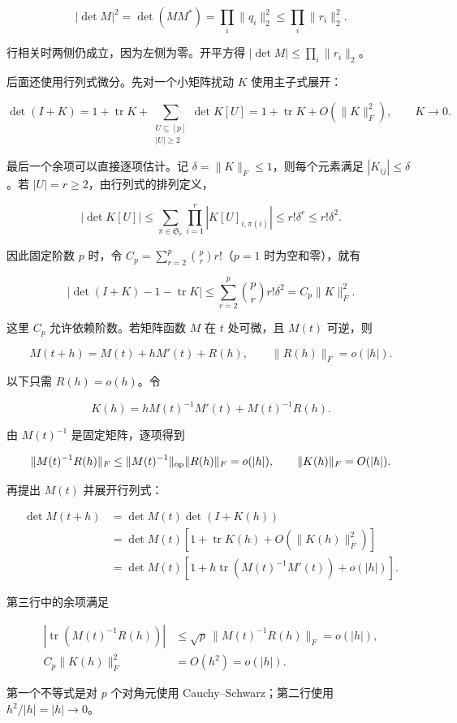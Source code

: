 \documentclass[11pt,a4paper]{article}
\begin{document}
\[|\det M|^2=\det(MM^*)=\prod_i\|q_i\|_2^2
\le\prod_i\|r_i\|_2^2.\]

行相关时两侧仍成立，因为左侧为零。开平方得 \(|\det M|\le\prod_i\|r_i\|_2\)。

后面还使用行列式微分。先对一个小矩阵扰动 \(K\) 使用主子式展开：

\[\det(I+K)=1+\operatorname{tr}K+
\sum_{\substack{U\subseteq[p]\\|U|\ge2}}\det K[U]
=1+\operatorname{tr}K+O(\|K\|_F^2),\qquad K\to0.\]

最后一个余项可以直接逐项估计。记 \(\delta=\|K\|_F\le1\)，则每个元素满足 \(|K_{ij}|\le\delta\)。若 \(|U|=r\ge2\)，由行列式的排列定义，

\[|\det K[U]|
\le\sum_{\pi\in \mathfrak S_r}\prod_{i=1}^r|K[U]_{i,\pi(i)}|
\le r!\delta^r\le r!\delta^2.\]

因此固定阶数 \(p\) 时，令 \(C_p=\sum_{r=2}^p\binom pr r!\)（\(p=1\) 时为空和零），就有

\[\left|\det(I+K)-1-\operatorname{tr}K\right|
\le\sum_{r=2}^p\binom pr r!\delta^2=C_p\|K\|_F^2.\]

这里 \(C_p\) 允许依赖阶数。若矩阵函数 \(M\) 在 \(t\) 处可微，且 \(M(t)\) 可逆，则

\[M(t+h)=M(t)+hM'(t)+R(h),\qquad
\|R(h)\|_F=o(|h|).\]

以下只需 \(R(h)=o(h)\)。令

\[K(h)=hM(t)^{-1}M'(t)+M(t)^{-1}R(h).\]

由 \(M(t)^{-1}\) 是固定矩阵，逐项得到

\[\|M(t)^{-1}R(h)\|_F
\le\|M(t)^{-1}\|_{\rm op}\|R(h)\|_F=o(|h|),
\qquad \|K(h)\|_F=O(|h|).\]

再提出 \(M(t)\) 并展开行列式：

\[\begin{aligned}
\det M(t+h)
&=\det M(t)\det(I+K(h))\\
&=\det M(t)\left[1+\operatorname{tr}K(h)+O(\|K(h)\|_F^2)\right]\\
&=\det M(t)\left[
1+h\operatorname{tr}(M(t)^{-1}M'(t))+o(|h|)\right].
\end{aligned}\]

第三行中的余项满足

\[\begin{aligned}
\left|\operatorname{tr}(M(t)^{-1}R(h))\right|
&\le\sqrt p\,\|M(t)^{-1}R(h)\|_F=o(|h|),\\
C_p\|K(h)\|_F^2&=O(h^2)=o(|h|).
\end{aligned}\]

第一个不等式是对 \(p\) 个对角元使用 Cauchy--Schwarz；第二行使用 \(h^2/|h|=|h|\to0\)。
\end{document}
